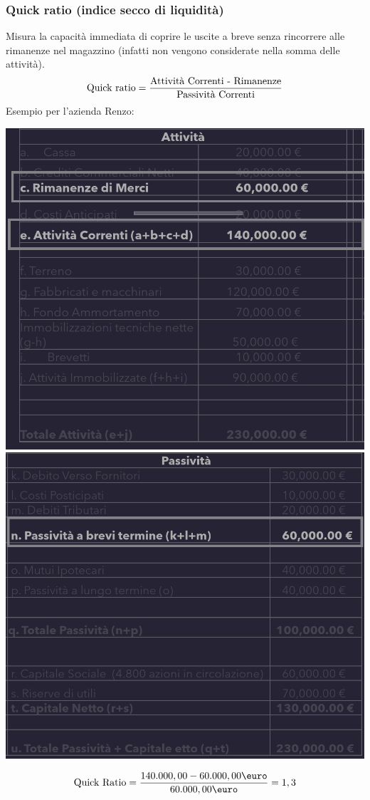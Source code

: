 \documentclass{article}
\begin{document}
\subsubsection{Quick ratio (indice secco di liquidità)}
Misura la capacità immediata di coprire le uscite a breve senza rincorrere alle rimanenze nel magazzino (infatti non vengono considerate nella somma delle attività).
\[
    \text{Quick ratio} = \frac{\text{Attività Correnti - Rimanenze}}{\text{Passività Correnti}}
\]
Esempio per l'azienda Renzo:
\begin{center}
    \includegraphics[scale=0.3]{Image/QuickRatio_1.png}
    \includegraphics[scale=0.3]{Image/QuickRatio_2.png}
\end{center}
\[
    \T{Quick Ratio} = \frac{140.000,00-60.000,00\T{\euro}}{60.000,00\T{\euro}} = 1,3
\]
\end{document}
